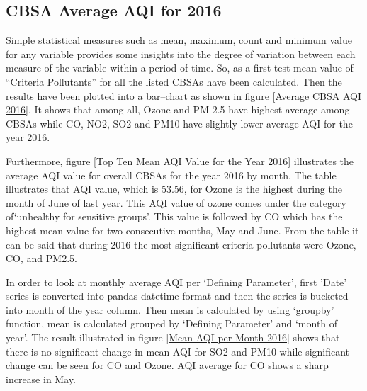 \documentclass[sigconf]{acmart}
\begin{document}
\subsection{CBSA Average AQI for 2016}
   Simple statistical measures such as mean, maximum, count and minimum value for any variable provides some insights into the degree of variation between each measure of the variable within a period of time. So, as a first test mean value of ``Criteria Pollutants'' for all the listed CBSAs have been calculated. Then the results have been plotted into a bar--chart as shown in figure \ref{Average CBSA AQI 2016}. It shows that among all, Ozone and PM 2.5 have highest average among CBSAs while CO, NO2, SO2 and PM10 have slightly lower average AQI for the year 2016.  

   Furthermore, figure \ref{Top Ten Mean AQI Value for the Year 2016} illustrates the average AQI value for overall CBSAs for the year 2016 by month. The table illustrates that AQI value, which is 53.56, for Ozone is the highest during the month of June of last year. This AQI value of ozone comes under the category of`unhealthy for sensitive groups'. This value is followed by CO which has the highest mean value for two consecutive months, May and June. From the table it can be said that during 2016 the most significant criteria pollutants were Ozone, CO, and PM2.5.

   In order to look at monthly average AQI per `Defining Parameter', first 'Date' series is converted into pandas datetime format and then the series is bucketed into month of the year column. Then mean is calculated by using `groupby' function, mean is calculated grouped by `Defining Parameter' and `month of year'. The result illustrated in figure \ref{Mean AQI per Month 2016} shows that there is no  significant change in mean AQI for SO2 and PM10 while significant change can be seen for CO and Ozone. AQI average for CO shows a sharp increase in May. 
\end{document}
